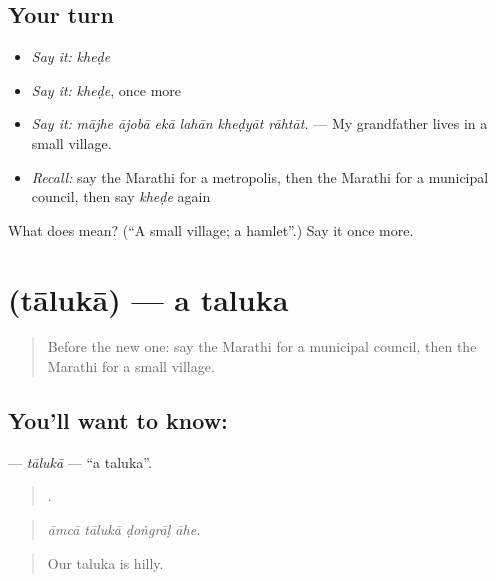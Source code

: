 \subsection*{Your turn}
\begin{itemize}
\raggedright
  \item \emph{Say it:} \emph{kheḍe}
  \item \emph{Say it:} \emph{kheḍe}, once more
  \item \emph{Say it:} \emph{mājhe ājobā ekā lahān kheḍyāt rāhtāt.} — My grandfather lives in a small village.
  \item \emph{Recall:} say the Marathi for a metropolis, then the Marathi for a municipal council, then say \emph{kheḍe} again
\end{itemize}

\begin{tcolorbox}[breakable,colback=teal!4,colframe=teal!35!black,title={Before you move on}]
What does  mean? (\textquotedblleft{}A small village; a hamlet\textquotedblright{}.) Say it once more.
\end{tcolorbox}
\section[\texorpdfstring{\mr{तालुका} (tālukā)}{तालुका (tālukā)}]{ (tālukā) — a taluka}

\label{lesson:MR-C418-taluka}



\begin{quote}
Before the new one: say the Marathi for a municipal council, then the Marathi for a small village.
\end{quote}

\subsection*{You'll want to know: }
\textbf{} — \emph{tālukā} — \textquotedblleft{}a taluka\textquotedblright{}.

\begin{quote}
   .
\end{quote}

\begin{quote}
\emph{āmcā tālukā ḍoṅgrāḷ āhe.}
\end{quote}

\begin{quote}
Our taluka is hilly.
\end{quote}

